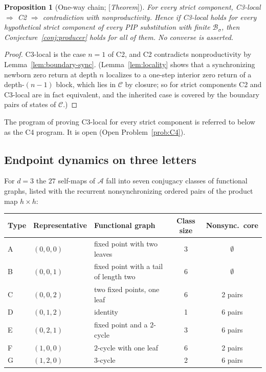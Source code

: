 \documentclass[11pt]{amsart}
\theoremstyle{plain}
\newtheorem{proposition}[theorem]{Proposition}
\theoremstyle{definition}
\theoremstyle{remark}
\newcommand{\A}{\mathcal{A}}
\newcommand{\B}{\mathcal{B}}
\newcommand{\cC}{\mathcal{C}}
\newcommand{\Status}[1]{\textup{[\textit{#1}]}}
\begin{document}
\begin{proposition}[One-way chain; \Status{Theorem}]\label{prop:chain}
For every strict component, C3-local $\Rightarrow$ C2 $\Rightarrow$ contradiction with nonproductivity. Hence if C3-local holds for every hypothetical strict component of every PIP substitution with finite $\B_\sigma$, then Conjecture~\ref{conj:producer} holds for all of them. No converse is asserted.
\end{proposition}
\begin{proof}
C3-local is the case $n=1$ of C2, and C2 contradicts nonproductivity by Lemma~\ref{lem:boundary-sync}. (Lemma~\ref{lem:locality} shows that a synchronizing newborn zero return at depth $n$ localizes to a one-step interior zero return of a depth-$(n-1)$ block, which lies in $\cC$ by closure; so for strict components C2 and C3-local are in fact equivalent, and the inherited case is covered by the boundary pairs of states of $\cC$.)
\end{proof}

The program of proving C3-local for every strict component is referred to below as the C4 program. It is open (Open Problem~\ref{prob:C4}).

\subsection{Endpoint dynamics on three letters}\label{sec:endpoint}

For $d=3$ the $27$ self-maps of $\A$ fall into seven conjugacy classes of functional graphs, listed with the recurrent nonsynchronizing ordered pairs of the product map $h\times h$:

\begin{center}
\begin{tabular}{@{}lllcc@{}}
\toprule
Type & Representative & Functional graph & Class size & Nonsync.\ core \\
\midrule
A & $(0,0,0)$ & fixed point with two leaves & 3 & $\emptyset$\\
B & $(0,0,1)$ & fixed point with a tail of length two & 6 & $\emptyset$\\
C & $(0,0,2)$ & two fixed points, one leaf & 6 & 2 pairs\\
D & $(0,1,2)$ & identity & 1 & 6 pairs\\
E & $(0,2,1)$ & fixed point and a $2$-cycle & 3 & 6 pairs\\
F & $(1,0,0)$ & $2$-cycle with one leaf & 6 & 2 pairs\\
G & $(1,2,0)$ & $3$-cycle & 2 & 6 pairs\\
\bottomrule
\end{tabular}
\end{center}
\end{document}
